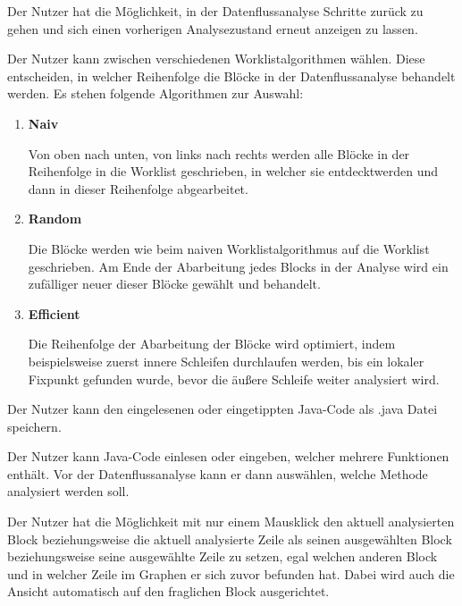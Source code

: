 Der Nutzer hat die Möglichkeit, in der Datenflussanalyse Schritte zurück zu gehen
und sich einen vorherigen Analysezustand erneut anzeigen zu lassen.

Der Nutzer kann zwischen verschiedenen Worklistalgorithmen wählen. Diese
entscheiden, in welcher Reihenfolge die Blöcke in der Datenflussanalyse behandelt
werden. Es stehen folgende Algorithmen zur Auswahl:
\begin{enumerate}[label=(\alph*)]
\item \textbf{Naiv} \par
Von oben nach unten, von links nach rechts werden alle Blöcke in der Reihenfolge in
die Worklist geschrieben, in welcher sie \glqq entdeckt\grqq werden und dann in dieser Reihenfolge abgearbeitet.
\item \textbf{Random} \par
Die Blöcke werden wie beim naiven Worklistalgorithmus auf die Worklist geschrieben. Am Ende der Abarbeitung jedes Blocks in der Analyse wird ein
zufälliger neuer dieser Blöcke gewählt und behandelt.
\item \textbf{Efficient} \par
Die Reihenfolge der Abarbeitung der Blöcke wird optimiert, indem beispielsweise
zuerst innere Schleifen durchlaufen werden, bis ein lokaler Fixpunkt gefunden wurde, bevor die äußere Schleife weiter analysiert wird.
\end{enumerate}

Der Nutzer kann den eingelesenen oder eingetippten Java-Code als .java Datei
speichern.

Der Nutzer kann Java-Code einlesen oder eingeben, welcher mehrere Funktionen
enthält. Vor der Datenflussanalyse kann er dann auswählen, welche Methode
analysiert werden soll.

Der Nutzer hat die Möglichkeit mit nur einem Mausklick den aktuell analysierten
Block beziehungsweise die aktuell analysierte Zeile als seinen ausgewählten Block beziehungsweise seine ausgewählte Zeile zu setzen, egal welchen anderen Block und in welcher Zeile im Graphen er sich zuvor befunden hat. Dabei wird auch die Ansicht automatisch auf den fraglichen Block ausgerichtet.

